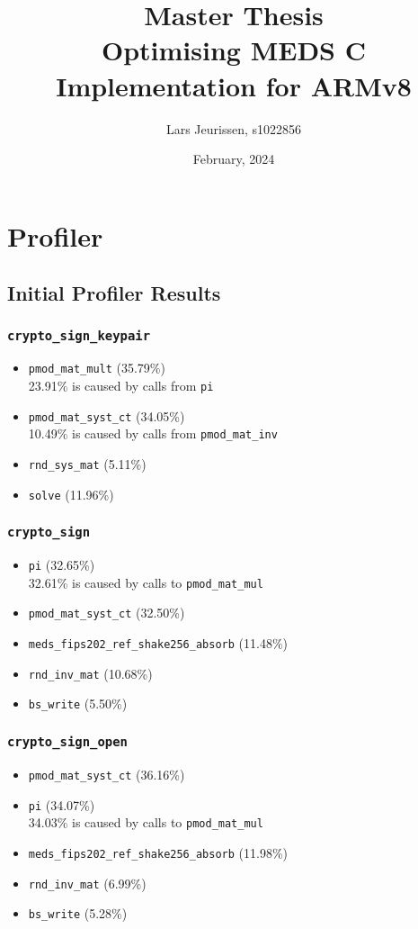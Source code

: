 \documentclass[a4paper]{article}
\title{Master Thesis \\ Optimising MEDS C Implementation for ARMv8}
\author{Lars Jeurissen, s1022856}
\date{February, 2024}
\begin{document}
\maketitle

\section{Profiler}
\subsection{Initial Profiler Results}
\subsubsection{\texttt{crypto\_sign\_keypair}}
\begin{itemize}
    \item \texttt{pmod\_mat\_mult} (35.79\%)\\
    23.91\% is caused by calls from \texttt{pi}
    \item \texttt{pmod\_mat\_syst\_ct} (34.05\%)\\
    10.49\% is caused by calls from \texttt{pmod\_mat\_inv}
    \item \texttt{rnd\_sys\_mat} (5.11\%)
    \item \texttt{solve} (11.96\%)
\end{itemize}

\subsubsection{\texttt{crypto\_sign}}
\begin{itemize}
    \item \texttt{pi} (32.65\%)\\
    32.61\% is caused by calls to \texttt{pmod\_mat\_mul}
    \item \texttt{pmod\_mat\_syst\_ct} (32.50\%)
    \item \texttt{meds\_fips202\_ref\_shake256\_absorb} (11.48\%)
    \item \texttt{rnd\_inv\_mat} (10.68\%)
    \item \texttt{bs\_write} (5.50\%)
\end{itemize}

\subsubsection{\texttt{crypto\_sign\_open}}
\begin{itemize}
    \item \texttt{pmod\_mat\_syst\_ct} (36.16\%)
    \item \texttt{pi} (34.07\%)\\
    34.03\% is caused by calls to \texttt{pmod\_mat\_mul}
    \item \texttt{meds\_fips202\_ref\_shake256\_absorb} (11.98\%)
    \item \texttt{rnd\_inv\_mat} (6.99\%)
    \item \texttt{bs\_write} (5.28\%)
\end{itemize}
\end{document}
